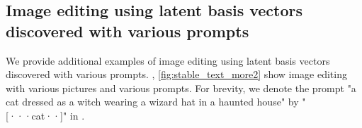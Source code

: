 \subsection{Image editing using latent basis vectors discovered with various prompts}

We provide additional examples of image editing using latent basis vectors discovered with various prompts. , \ref{fig:stable_text_more2} show image editing with various pictures and various prompts. 
For brevity, we denote the prompt "a cat dressed as a witch wearing a wizard hat in a haunted house" by "[···cat··]" in .

